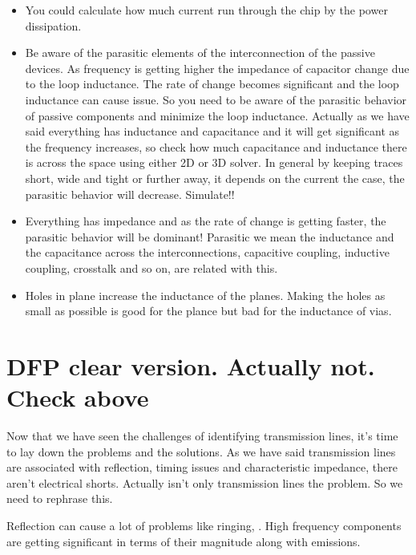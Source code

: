 \documentclass[12pt]{article}
\begin{document}
\begin{itemize}
	\item You could calculate how much current run through the chip by the power dissipation.
	
	\item Be aware of the parasitic elements of the interconnection of the passive devices. As frequency is getting higher the impedance of capacitor change due to the loop inductance. The rate of change becomes significant and the loop inductance can cause issue. So you need to be aware of the parasitic behavior of passive components and minimize the loop 
	inductance.	Actually as we have said everything has inductance and capacitance and it will get significant as the frequency increases, so check how much capacitance and inductance there is across the space using either 2D or 3D solver. In general by keeping traces short, wide and tight or further away, it depends on the current the case, the parasitic behavior will decrease. Simulate!!
	
	\item Everything has impedance and as the rate of change is getting faster, the parasitic behavior will be dominant! Parasitic we mean the inductance and the capacitance across the interconnections, capacitive coupling, inductive coupling, crosstalk and so on, are related with this.
	
	\item Holes in plane increase the inductance of the planes. Making the holes as small as possible is good for the plance but bad for the inductance of vias.
	
\end{itemize}



\section{DFP clear version. Actually not. Check above}

Now that we have seen the challenges of identifying transmission lines, it's time to lay down the problems and the solutions. As we have said transmission lines are associated with reflection, timing issues and characteristic impedance, there aren't electrical shorts. Actually isn't only transmission lines the problem. So we need to rephrase this.

Reflection can cause a lot of problems like ringing, . High frequency components are getting significant in terms of their magnitude along with emissions. 
\end{document}
